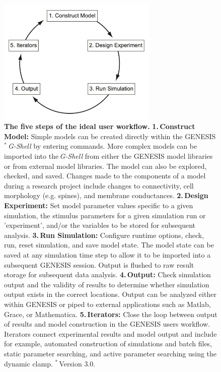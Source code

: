 \documentclass{article}
\begin{document}
\begin{figure}[h!t]
  \begin{center}
    \includegraphics[width=3in]{figures/user-workflow.pdf}
  \end{center}
  \vspace*{-\lineskip}
  \caption{ \small{{\bf The five steps of the ideal user workflow.} {\textbf{1.\,Construct Model:} Simple models can be created directly within the GENESIS$^*$\,\textit{G-Shell} by entering commands. More complex models can be imported into the\,\textit{G-Shell} from either the GENESIS model libraries or from external model libraries. The model can also be explored, checked, and saved. Changes made to the components of a model during a research project include changes to connectivity, cell morphology (e.g. spines), and membrane conductances. \textbf{2.\,Design Experiment:} Set model parameter values specific to a given simulation, the stimulus parameters for a given simulation run or 'experiment', and/or the variables to be stored for subsequent analysis.} \textbf{3.\,Run Simulation:} Configure runtime options, check, run, reset simulation, and save model state. The model state can be saved at any simulation time step to allow it to be imported into a subsequent GENESIS session. Output is flushed to raw result storage for subsequent data analysis. \textbf{4.\,Output:} Check simulation output and the validity of results to determine whether simulation output exists in the correct locations. Output can be analyzed either within GENESIS or piped to external applications such as Matlab, Grace, or Mathematica. \textbf{5.\,Iterators:} Close the loop between output of results and model construction in the GENESIS users workflow. Iterators connect experimental results and model output and include for example, automated construction of simulations and batch files, static parameter searching, and active parameter searching using the dynamic clamp. $^*$\,Version 3.0.}}
  \label{fig:user-workflow}
\end{figure}
\end{document}
